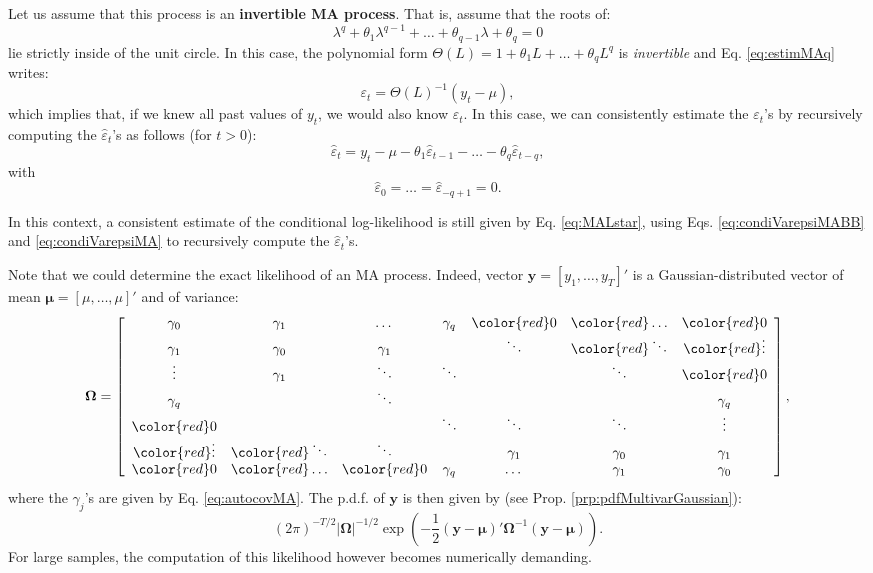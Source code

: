 \documentclass[
  12pt,
]{book}
\theoremstyle{definition}
\theoremstyle{definition}
\theoremstyle{definition}
\theoremstyle{definition}
\theoremstyle{remark}
\begin{document}
Let us assume that this process is an \textbf{invertible MA process}. That is, assume that the roots of:
\begin{equation}
\lambda^q + \theta_1 \lambda^{q-1} + \dots + \theta_{q-1} \lambda + \theta_q = 0 \label{eq:invertible}
\end{equation}
lie strictly inside of the unit circle. In this case, the polynomial form \(\Theta(L)=1 + \theta_1 L + \dots + \theta_q L^q\) is \emph{invertible} and Eq. \eqref{eq:estimMAq} writes:
\[
\varepsilon_t = \Theta(L)^{-1}(y_t - \mu),
\]
which implies that, if we knew all past values of \(y_t\), we would also know \(\varepsilon_t\). In this case, we can consistently estimate the \(\varepsilon_t\)'s by recursively computing the \(\hat\varepsilon_t\)'s as follows (for \(t>0\)):
\begin{equation}
\hat\varepsilon_t = y_t - \mu - \theta_1 \hat\varepsilon_{t-1} - \dots  - \theta_q \hat\varepsilon_{t-q},\label{eq:condiVarepsiMABB}
\end{equation}
with
\begin{equation}
\hat\varepsilon_{0}=\dots=\hat\varepsilon_{-q+1}=0.\label{eq:condiVarepsiMA}
\end{equation}

In this context, a consistent estimate of the conditional log-likelihood is still given by Eq. \eqref{eq:MALstar}, using Eqs. \eqref{eq:condiVarepsiMABB} and \eqref{eq:condiVarepsiMA} to recursively compute the \(\hat\varepsilon_t\)'s.

Note that we could determine the exact likelihood of an MA process. Indeed, vector \(\mathbf{y} = [y_1,\dots,y_T]'\) is a Gaussian-distributed vector of mean \(\boldsymbol\mu = [\mu,\dots,\mu]'\) and of variance:
\[
\boldsymbol\Omega = \left[\begin{array}{ccccccc}
\gamma_0 & \gamma_1&\dots&\gamma_q&{\color{red}0}&{\color{red}\dots}&{\color{red}0}\\
\gamma_1 & \gamma_0&\gamma_1&&\ddots&{\color{red}\ddots}&{\color{red}\vdots}\\
\vdots & \gamma_1&\ddots&\ddots&&\ddots&{\color{red}0}\\
\gamma_q &&\ddots&&&&\gamma_q\\
{\color{red}0} &&&\ddots&\ddots&\ddots&\vdots\\
{\color{red}\vdots}&{\color{red}\ddots}&\ddots&&\gamma_1&\gamma_0&\gamma_1\\
{\color{red}0}&{\color{red}\dots}&{\color{red}0}&\gamma_q&\dots&\gamma_1&\gamma_0
\end{array}\right],
\]
where the \(\gamma_j\)'s are given by Eq. \eqref{eq:autocovMA}. The p.d.f. of \(\mathbf{y}\) is then given by (see Prop. \ref{prp:pdfMultivarGaussian}):
\[
(2\pi)^{-T/2}|\boldsymbol\Omega|^{-1/2}\exp\left( -\frac{1}{2} (\mathbf{y}-\boldsymbol\mu)' \boldsymbol\Omega^{-1} (\mathbf{y}-\boldsymbol\mu)\right).
\]
For large samples, the computation of this likelihood however becomes numerically demanding.
\end{document}

